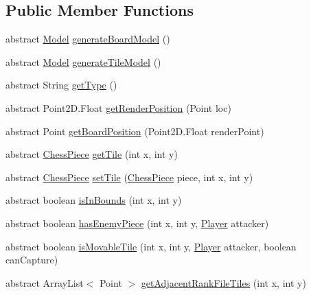 \subsection*{Public Member Functions}
\begin{DoxyCompactItemize}
\item 
abstract \hyperlink{classview_1_1loaders_1_1structures_1_1_model}{Model} \hyperlink{classmodel_1_1board_1_1_board_a27db942b8b62795b8e8e615c2e39b432}{generate\-Board\-Model} ()
\item 
abstract \hyperlink{classview_1_1loaders_1_1structures_1_1_model}{Model} \hyperlink{classmodel_1_1board_1_1_board_a40de2efe23a2a995394e7223a5c85896}{generate\-Tile\-Model} ()
\item 
abstract String \hyperlink{classmodel_1_1board_1_1_board_a6d5675d9156c70de1c08842cea728749}{get\-Type} ()
\item 
abstract Point2\-D.\-Float \hyperlink{classmodel_1_1board_1_1_board_a2e1be001e288e4501a80844b45024a94}{get\-Render\-Position} (Point loc)
\item 
abstract Point \hyperlink{classmodel_1_1board_1_1_board_adbfd9f6c5999ef5a9705abbfadb8c924}{get\-Board\-Position} (Point2\-D.\-Float render\-Point)
\item 
abstract \hyperlink{classmodel_1_1_chess_piece}{Chess\-Piece} \hyperlink{classmodel_1_1board_1_1_board_a430d840f3362de265f54f815bf02893a}{get\-Tile} (int x, int y)
\item 
abstract \hyperlink{classmodel_1_1_chess_piece}{Chess\-Piece} \hyperlink{classmodel_1_1board_1_1_board_a2ee2df58c449ad4251b26266a1c326d7}{set\-Tile} (\hyperlink{classmodel_1_1_chess_piece}{Chess\-Piece} piece, int x, int y)
\item 
abstract boolean \hyperlink{classmodel_1_1board_1_1_board_a7c4c6d14284584b90dd969ba80bda496}{is\-In\-Bounds} (int x, int y)
\item 
abstract boolean \hyperlink{classmodel_1_1board_1_1_board_ae6c8e172c9bb977b3be9f023736a3f80}{has\-Enemy\-Piece} (int x, int y, \hyperlink{classcontroller_1_1_player}{Player} attacker)
\item 
abstract boolean \hyperlink{classmodel_1_1board_1_1_board_abbfd0ab523b5a8953556ff6aad8d42c6}{is\-Movable\-Tile} (int x, int y, \hyperlink{classcontroller_1_1_player}{Player} attacker, boolean can\-Capture)
\item 
abstract Array\-List$<$ Point $>$ \hyperlink{classmodel_1_1board_1_1_board_adae13d194d3acf1ae586162cf8ae6786}{get\-Adjacent\-Rank\-File\-Tiles} (int x, int y)
\item 

\end{DoxyCompactItemize}
